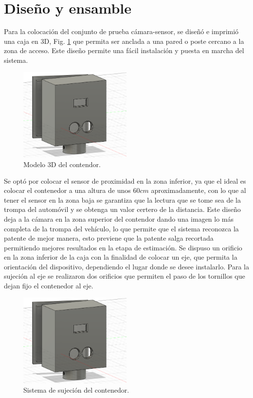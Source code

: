 \section{Diseño y ensamble}

Para la colocación del conjunto de prueba cámara-sensor, se diseñó e imprimió una caja en 3D, Fig. \ref{fig:contenedor-camara} que permita ser anclada a una pared o poste cercano a la zona de acceso. Este diseño permite una fácil instalación y puesta en marcha del sistema.
\begin{figure}
    \centering
    \includegraphics[width=0.5\textwidth]{imgs/contenedor-camara.png}
    \caption{Modelo 3D del contendor.}
    \label{fig:contenedor-camara}
\end{figure}

Se optó por colocar el sensor de proximidad en la zona inferior, ya que el ideal es colocar el contenedor a una altura de unos $60cm$ aproximadamente, con lo que al tener el sensor en la zona baja se garantiza que la lectura que se tome sea de la trompa del automóvil y se obtenga un valor certero de la distancia. Este diseño deja a la cámara en la zona superior del contendor dando una imagen lo más completa de la trompa del vehículo, lo que permite que el sistema reconozca la patente de mejor manera, esto previene que la patente salga recortada permitiendo mejores resultados en la etapa de estimación. Se dispuso un orificio en la zona inferior de la caja con la finalidad de colocar un eje, que permita la orientación del dispositivo, dependiendo
el lugar donde se desee instalarlo.
Para la sujeción al eje se realizaron dos orificios que permiten el paso de los tornillos que dejan fijo el contenedor al eje.
\begin{figure}
    \centering
    \includegraphics[width=0.5\textwidth]{imgs/contenedor-camara.png}
    \caption{Sistema de sujeción del contenedor.}
    \label{fig:sujecion-contenedor}
\end{figure}

